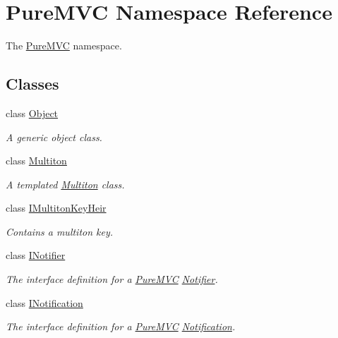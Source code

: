 \hypertarget{namespace_pure_m_v_c}{
\section{PureMVC Namespace Reference}
\label{namespace_pure_m_v_c}
}


The \hyperlink{namespace_pure_m_v_c}{PureMVC} namespace.  
\subsection*{Classes}
\begin{DoxyCompactItemize}
\item 
class \hyperlink{class_pure_m_v_c_1_1_object}{Object}
\begin{DoxyCompactList}\small\item\em A generic object class. \item\end{DoxyCompactList}\item 
class \hyperlink{class_pure_m_v_c_1_1_multiton}{Multiton}
\begin{DoxyCompactList}\small\item\em A templated \hyperlink{class_pure_m_v_c_1_1_multiton}{Multiton} class. \item\end{DoxyCompactList}\item 
class \hyperlink{class_pure_m_v_c_1_1_i_multiton_key_heir}{IMultitonKeyHeir}
\begin{DoxyCompactList}\small\item\em Contains a multiton key. \item\end{DoxyCompactList}\item 
class \hyperlink{class_pure_m_v_c_1_1_i_notifier}{INotifier}
\begin{DoxyCompactList}\small\item\em The interface definition for a \hyperlink{namespace_pure_m_v_c}{PureMVC} \hyperlink{class_pure_m_v_c_1_1_notifier}{Notifier}. \item\end{DoxyCompactList}\item 
class \hyperlink{class_pure_m_v_c_1_1_i_notification}{INotification}
\begin{DoxyCompactList}\small\item\em The interface definition for a \hyperlink{namespace_pure_m_v_c}{PureMVC} \hyperlink{class_pure_m_v_c_1_1_notification}{Notification}. \item\end{DoxyCompactList}\item 

\end{DoxyCompactItemize}
